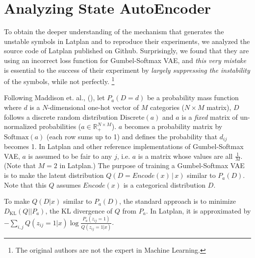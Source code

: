 \section{Analyzing State AutoEncoder}
\label{sae}

To obtain the deeper understanding of the mechanism that generates the
unstable symbols in Latplan and to reproduce their experiments, we
analyzed the source code of Latplan published on Github.
% 
Surprisingly, we found that they are using an incorrect loss function for Gumbel-Softmax VAE,
and \emph{this very mistake} is essential to the success of their experiment
by \emph{largely suppressing the instability} of the symbols, while not perfectly.
\footnote{The original authors are not the expert in Machine Learning.}

 
Following Maddison et. al., (\citeyear[Appendix C.1]{MaddisonMT17}),
let $P_a(D=d)$ be a probability mass function where
$d$ is a $N$-dimensional one-hot vector of $M$ categories ($N\times M$ matrix),
$D$ follows a discrete random distribution $\text{Discrete}(a)$ and
$a$ is a \emph{fixed} matrix of un-normalized probabilities ($a\in \mathbb{R}_+^{N\times M}$).
$a$ becomes a probability matrix by $\text{Softmax}(a)$ (each row sums up to 1)
and defines the probability that $d_{ij}$ becomes 1.
% 
In Latplan and other reference implementations \cite{ericjanggithub} of Gumbel-Softmax VAE,
$a$ is assumed to be fair to any $j$,
i.e. $a$ is a matrix whose values are all $\frac{1}{M}$. (Note that $M=2$ in Latplan.)
The purpose of training a Gumbel-Softmax VAE is to make the latent distribution $Q(D=Encode(x)\, |\, x)$ similar to $P_a(D)$.
Note that this $Q$ assumes $Encode(x)$ is a categorical distribution $D$.


To make $Q(D|x)$ similar to $P_a(D)$, the standard approach is to minimize $D_{\text{KL}}(Q||P_a)$,
the KL divergence of $Q$ from $P_a$.
In Latplan, it is approximated by $- \sum_{i,j} Q(z_{ij}=1|x) \log\frac{P_a(z_{ij}=1)}{Q(z_{ij}=1|x)}$.
\cite[Eq.22 --- However, it lacks negation because it is discussing a maximization objective.]{MaddisonMT17}

